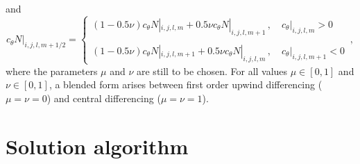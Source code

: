\documentclass[12pt]{book}
\begin{document}
and
\begin{equation}
  c_\theta N|_{i,j,l,m+1/2} = \left\{
                               \begin{array}{l}
                                (1 - 0.5 \nu) c_\theta N|_{i,j,l,m} + 0.5 \nu c_\theta N|_{i,j,l,m+1}\,,
                                \quad c_\theta|_{i,j,l,m} > 0 \\
                                \\
                                (1 - 0.5 \nu) c_\theta N|_{i,j,l,m+1} + 0.5 \nu c_\theta N|_{i,j,l,m}\,,
                                \quad c_\theta|_{i,j,l,m+1} < 0
                              \end{array}
                             \right.\, ,
  \label{eq:fluxt}
\end{equation}
where the parameters $\mu$ and $\nu$ are still to be chosen. For all values $\mu \in [0,1]$ and $\nu \in [0,1]$,
a blended form arises between first order upwind differencing ($\mu = \nu = 0$) and central differencing
($\mu = \nu = 1$).

\section{Solution algorithm} \label{sec:sol}
\end{document}
